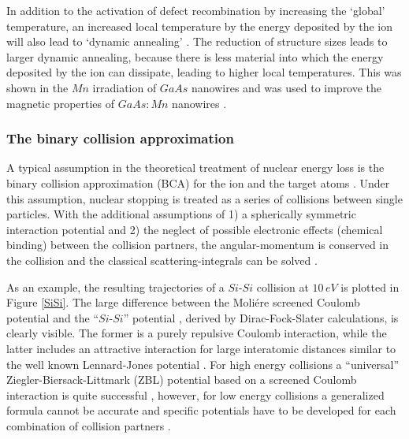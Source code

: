 In addition to the activation of defect recombination by increasing the `global' temperature, an increased local temperature by the energy deposited by the ion will also lead to `dynamic annealing' \cite{dhara_formation_2007}. The reduction of structure sizes leads to larger dynamic annealing, because there is less material into which the energy deposited by the ion can dissipate, leading to higher local temperatures. This was shown in the $Mn$ irradiation of $GaAs$ nanowires \cite{borschel_ion-solid_2012,johannes_ion_2015} and was used to improve the magnetic properties of $GaAs:Mn$ nanowires \cite{borschel_new_2011,paschoal_hopping_2012,kumar_magnetic_2013,paschoal_magnetoresistance_2014}. 


\subsubsection{The binary collision approximation}

A typical assumption in the theoretical treatment of nuclear energy loss is the binary collision approximation (BCA) for the ion and the target atoms \cite{eckstein_computer_1991}. Under this assumption, nuclear stopping is treated as a series of collisions between single particles. With the additional assumptions of 1) a spherically symmetric interaction potential and 2) the neglect of possible electronic effects (chemical binding) between the collision partners, the angular-momentum is conserved in the collision and the classical scattering-integrals can be solved \cite{ziegler_stopping_1985}. 

As an example, the resulting trajectories of a $Si$-$Si$ collision at $10\,eV$ is plotted in Figure \ref{SiSi}. The large difference between the Moliére screened Coulomb potential \cite{moliere_theorie_1947} and the ``$Si$-$Si$'' potential \cite{hackel_inter-nuclear_1990}, derived by Dirac-Fock-Slater calculations, is clearly visible. The former is a purely repulsive Coulomb interaction, while the latter includes an attractive interaction for large interatomic distances similar to the well known Lennard-Jones potential \cite{jones_determination_1924,eckstein_computer_1991}. For high energy collisions a ``universal'' Ziegler-Biersack-Littmark (ZBL) potential based on a screened Coulomb interaction is quite successful \cite{ziegler_stopping_1985}, however, for low energy collisions a generalized formula cannot be accurate and specific potentials have to be developed for each combination of collision partners \cite{dedkov_interatomic_1995,nordlund_repulsive_1997,albe_modeling_2002,nordlund_interatomic_2008}.


